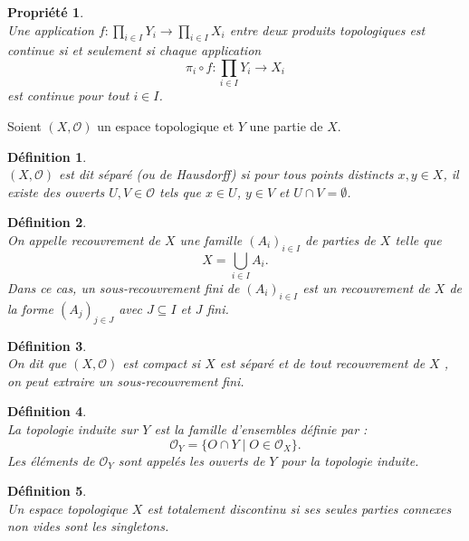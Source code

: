 \documentclass[a4paper, 14pt]{report}
\newtheorem{definition}{Définition}[section]
\newtheorem{propriety}{Propriété}[section]
\begin{document}
\begin{onehalfspace}
{\begin{propriety}  \cite{bourbaki2013general}\\
Une application \( f:  \prod_{i \in I} Y_i \to \prod_{i \in I} X_i \) entre deux produits topologiques est continue si et seulement si chaque application  
\[
\pi_i \circ f: \prod_{i \in I} Y_i \to X_i
\]
est continue pour tout \( i \in I \).
\end{propriety}

Soient \( (X, \mathcal{O})\) un espace topologique et \( Y \) une partie de \( X \).

\begin{definition}\cite{bourbaki2013general}\\
	\( (X, \mathcal{O}) \) est dit séparé (ou de Hausdorff) si pour tous points distincts \( x, y \in X \), il existe des ouverts \( U, V \in \mathcal{O} \) tels que \( x \in U \), \( y \in V \) et \( U \cap V = \emptyset \).
\end{definition}


\begin{definition} \cite{kuratowski2014topology}\\
	On appelle recouvrement de \( X \) une famille \( (A_i)_{i \in I} \) de parties de \( X \) telle que 
	\[
	X = \bigcup_{i \in I} A_i.
	\]
	Dans ce cas, un sous-recouvrement fini de \( (A_i)_{i \in I} \) est un recouvrement de \( X \) de la forme \( (A_j)_{j \in J} \) avec \( J \subseteq I \) et \(J\) fini.
\end{definition}

\begin{definition} \cite{kuratowski2014topology}\\
	On dit que \( (X, \mathcal{O})\) est compact si \( X \) est séparé et de tout recouvrement de \( X \) , on peut extraire un sous-recouvrement fini.
\end{definition}


\begin{definition} \cite{kuratowski2014topology}\\
	La topologie induite sur \( Y \) est la famille d’ensembles définie par :
	\[
	\mathcal{O}_Y = \{ O \cap Y \mid O \in \mathcal{O}_X \}.
	\]
	Les éléments de \( \mathcal{O}_Y \) sont appelés les ouverts de \( Y \) pour la topologie induite.
\end{definition}

\begin{definition} \cite{kuratowski2014topology}\\
Un espace topologique \( X \) est totalement discontinu si ses seules parties connexes non vides sont les singletons.
\end{definition}


}
\end{onehalfspace}
\end{document}
